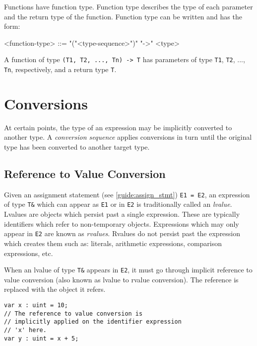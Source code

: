 Functions have function type. Function type describes the type of each parameter and the return type of the function. Function type can be written and has the form:

\begin{minip}
\begin{grammar}
<function-type> ::= "("<type-sequence>")" "->" <type>
\end{grammar}
\end{minip}

A function of type \texttt{(T1, T2, ..., Tn) -> T} has parameters of type \texttt{T1}, \texttt{T2}, ..., \texttt{Tn}, respectively, and a return type \texttt{T}.

\section{Conversions} \label{guide:conversions}

At certain points, the type of an expression may be implicitly converted to another type. A \textit{conversion sequence} applies conversions in turn until the original type has been converted to another target type.

\subsection{Reference to Value Conversion} \label{guide:reftoval_conv}

Given an assignment statement (see \ref{guide:assign_stmt}) \texttt{E1 = E2},
an expression of type \texttt{T\&} which can appear as \texttt{E1} or in \texttt{E2} is traditionally called an \textit{lvalue}. Lvalues are objects which persist past a single expression. These are typically identifiers which refer to non-temporary objects. Expressions which may only appear in \texttt{E2} are known as \textit{rvalues}. Rvalues do not persist past the expression which creates them such as: literals, arithmetic expressions, comparison expressions, etc.

When an lvalue of type \texttt{T\&} appears in \texttt{E2}, it must go through implicit reference to value conversion (also known as lvalue to rvalue conversion). The reference is replaced with the object it refers.

\begin{minip}
\begin{lstlisting}
var x : uint = 10;
// The reference to value conversion is
// implicitly applied on the identifier expression
// 'x' here.
var y : uint = x + 5;
\end{lstlisting}
\end{minip}

